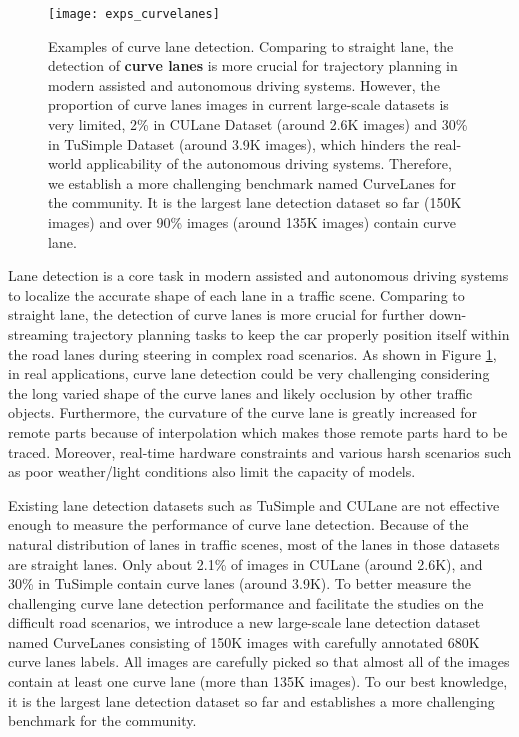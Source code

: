 \documentclass[runningheads]{llncs}
\begin{document}
\begin{figure}

\begin{centering}
\texttt{[image: exps\_curvelanes]}
\par\end{centering}


\caption{\label{fig:Curve-lane-detection}Examples of curve lane detection.
Comparing to straight lane, the detection of \textbf{curve lanes}
is more crucial for trajectory planning in modern assisted and autonomous
driving systems. However, the proportion of curve lanes images in
current large-scale datasets is very limited, 2\% in CULane Dataset
(around 2.6K images) and 30\% in TuSimple Dataset (around 3.9K images),
which hinders the real-world applicability of the autonomous driving
systems. Therefore, we establish a more challenging benchmark named
CurveLanes for the community. It is the largest lane detection dataset
so far (150K images) and over 90\% images (around 135K images) contain curve lane.}


\end{figure}

Lane detection is a core task in modern assisted and autonomous driving
systems to localize the accurate shape of each lane in a traffic scene.
Comparing to straight lane, the detection of curve lanes is more crucial
for further down-streaming trajectory planning tasks to keep the car
properly position itself within the road lanes during steering in
complex road scenarios. As shown in Figure \ref{fig:Curve-lane-detection},
in real applications, curve lane detection could be very challenging
considering the long varied shape of the curve lanes and likely occlusion
by other traffic objects. Furthermore, the curvature of the curve
lane is greatly increased for remote parts because of interpolation
which makes those remote parts hard to be traced. Moreover, real-time
hardware constraints and various harsh scenarios such as poor weather/light
conditions \cite{pan2018spatial} also limit the capacity of models.

Existing lane detection datasets such as TuSimple \cite{TuSimple}
and CULane \cite{pan2018spatial} are not effective enough to measure
the performance of curve lane detection. Because of the natural distribution
of lanes in traffic scenes, most of the lanes in those datasets are
straight lanes. Only about 2.1\% of images in CULane (around 2.6K),
and 30\% in TuSimple contain curve lanes (around 3.9K). To better
measure the challenging curve lane detection performance and facilitate
the studies on the difficult road scenarios, we introduce a new large-scale
lane detection dataset named CurveLanes consisting of 150K images
with carefully annotated 680K curve lanes labels. All images are carefully
picked so that almost all of the images contain at least one curve
lane (more than 135K images). To our best knowledge, it is the largest
lane detection dataset so far and establishes a more challenging benchmark
for the community.
\end{document}
